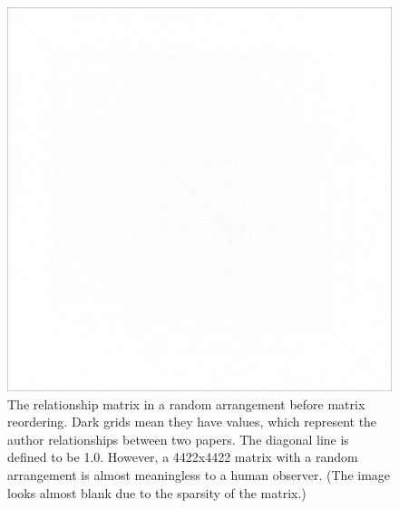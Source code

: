 \begin{figure}
    \centering
    \includegraphics[width=\textwidth]{images/random_arrangement.png}
    \caption{The relationship matrix in a random arrangement before matrix reordering.
        Dark grids mean they have values, which represent the author relationships between two papers.
        The diagonal line is defined to be 1.0.
        However, a 4422x4422 matrix with a random arrangement is almost meaningless to a human observer.
        (The image looks almost blank due to the sparsity of the matrix.)
    }
    \label{fig:matrix_random_arrangement}
\end{figure}
